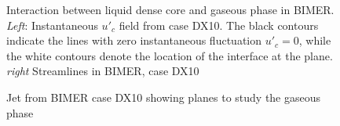 \begin{figure}[h!]
	\centering	{}
	\caption[Interaction between liquid dense core and gaseous phase in BIMER]{Interaction between liquid dense core and gaseous phase in BIMER. \textsl{Left}: Instantaneous $u'_c$ field from case DX10. The black contours indicate the lines with zero instantaneous fluctuation $u'_c = 0$, while the white contours denote the location of the interface at the plane. \textsl{right} Streamlines in BIMER, case DX10}
		\label{fig:jet_air_interaction_up_and_streamlines_vortices}
\end{figure}

\clearpage




\begin{figure}[h!]
	\centering	{}
	\caption{Jet from BIMER case DX10 showing planes to study the gaseous phase}
	\label{fig:BIMER_sps_with_gaseous_planes}
\end{figure}

